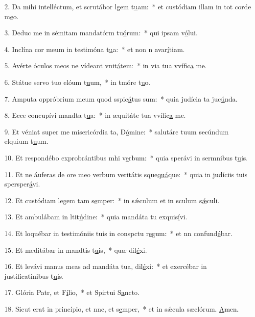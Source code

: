 2. Da mihi intelléctum, et scrutábor lgem t\uline{u}am:~* et custódiam illam in tot corde m\uline{e}o.\par 
3. Deduc me in sémitam mandatórm tu\uline{ó}rum:~* qui ipsam v\uline{ó}lui.\par 
4. Inclína cor meum in testimóna t\uline{u}a:~* et non n avar\uline{í}tiam.\par 
5. Avérte óculos meos ne vídeant vnit\uline{á}tem:~* in via tua vvífic\uline{a} me.\par 
6. Státue servo tuo elóum t\uline{u}um,~* in tmóre t\uline{u}o.\par 
7. Amputa oppróbrium meum quod sspic\uline{á}tus sum:~* quia judícia ta juc\uline{ú}nda.\par 
8. Ecce concupívi mandta t\uline{u}a:~* in æquitáte tua vvífic\uline{a} me.\par 
9. Et véniat super me misericórdia ta, D\uline{ó}mine:~* salutáre tuum secúndum elquium t\uline{u}um.\par 
10. Et respondébo exprobrántibus mhi v\uline{e}rbum:~* quia sperávi in sermnibus t\uline{u}is.\par 
11. Et ne áuferas de ore meo verbum veritátis sque\uline{quá}que:~* quia in judíciis tuis spersper\uline{á}vi.\par 
12. Et custódiam legem tam s\uline{e}mper:~* in sǽculum et in sculum s\uline{ǽ}culi.\par 
13. Et ambulábam in ltit\uline{ú}dine:~* quia mandáta tu exquis\uline{í}vi.\par 
14. Et loquébar in testimóniis tuis in conspctu r\uline{e}gum:~* et nn confund\uline{é}bar.\par 
15. Et meditábar in mandtis t\uline{u}is,~* quæ dil\uline{é}xi.\par 
16. Et levávi manus meas ad mandáta tua,  dil\uline{é}xi:~* et exercébar in justificatinibus t\uline{u}is.\par 
17. Glória Patr, et F\uline{í}lio,~* et Spirtui S\uline{a}ncto.\par 
18. Sicut erat in princípio, et nnc, et s\uline{e}mper,~* et in sǽcula sæclórum. \uline{A}men.\par 
